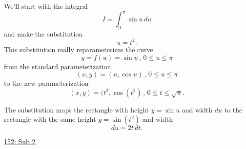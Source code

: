 \documentclass{ximera}
\begin{document}
\begin{example} \label{EKEMrerMMEF}
We'll start with the integral
\[
      I = \int_0^\pi \sin u \, du
\]
and make the substitution 
\[
     u = t^2 .
\]
This substitution really reparameterizes the curve
\[
   y = f(u) = \sin u \, , \, 0\leq u \leq \pi
\] 
from the standard parameterization
\[
   (x,y) = (u,\cos u) \, , \, 0\leq u \leq \pi
\]
to the new parameterization
\[
   (x,y) = (t^2,\cos (t^2) \, , \, 0\leq t \leq \sqrt{\pi}.
\]

The substitution maps the rectangle with height $y=\sin u$ and width $du$ to the rectangle with the same height $y=\sin(t^2)$ and width
\[
   du = 2t \,dt .
\]


\begin{onlineOnly}
    \begin{center}
\end{center}
\end{onlineOnly}

\href{https://www.desmos.com/calculator/toiwzzqkva}{152: Sub 2}


\end{example}
\end{document}

